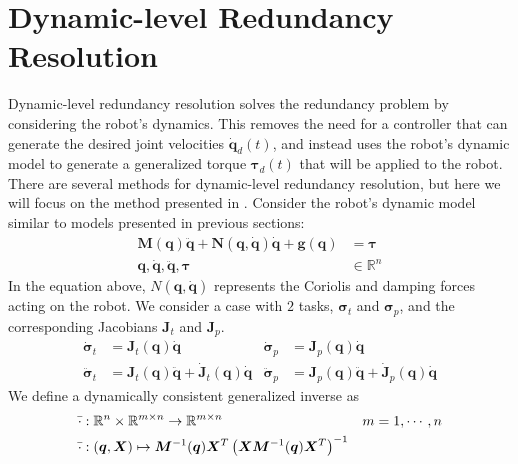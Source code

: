 \newpage
\section{Dynamic-level Redundancy Resolution}

Dynamic-level redundancy resolution solves the redundancy problem by considering
the robot's dynamics. This removes the need for a controller that can generate
the desired joint velocities $\dot{\bm{q}}_d(t)$, and instead uses the robot's
dynamic model to generate a generalized torque $\bm{\tau}_d(t)$ that will
be applied to the robot. There are several methods for dynamic-level redundancy
resolution, but here we will focus on the method presented in \cite{khatib2004}.
Consider the robot's dynamic model similar to models presented in previous sections:
\begin{subequations}
\begin{align}
    \bm{M}(\bm{q}) \ddot{\bm{q}} + \bm{N}(\bm{q}, \dot{\bm{q}}) \dot{\bm{q}} + \bm{g}(\bm{q}) &= \bm{\tau} \\
    \bm{q}, \dot{\bm{q}} ,\ddot{\bm{q}},\bm{\tau} &\in \mathbb{R}^n
\end{align}
\end{subequations}
In the equation above, $N(\bm{q}, \dot{\bm{q}})$ represents the Coriolis and
damping forces acting on the robot. We consider a case with $2$ tasks, $\bm{\sigma}_t$
and $\bm{\sigma}_p$, and the corresponding Jacobians $\bm{J}_t$ and $\bm{J}_p$.
\begin{subequations}
    \begin{align}
        \dot{\bm{\sigma}}_t &= \bm{J}_t(\bm{q}) \dot{\bm{q}} & \dot{\bm{\sigma}}_p &= \bm{J}_p(\bm{q}) \dot{\bm{q}} \\
        \ddot{\bm{\sigma}}_t &= \bm{J}_t(\bm{q}) \ddot{\bm{q}} + \dot{\bm{J}}_t(\bm{q}) \dot{\bm{q}} &
        \ddot{\bm{\sigma}}_p &= \bm{J}_p(\bm{q}) \ddot{\bm{q}} + \dot{\bm{J}}_p(\bm{q}) \dot{\bm{q}}
    \end{align}
\end{subequations}
We define a dynamically consistent generalized inverse \cite{khatib1987} as
\begin{subequations}
    \begin{align}
        \bar{\cdot} &: \mathbb{R}^n \times \mathbb{R}^{m\times n} \rightarrow \mathbb{R}^{m\times n} & m &= 1, \cdots, n\\
        \bar{\cdot} &: (\bm{q},\bm{X}) \mapsto \bm{M}^{-1}(\bm{q})\bm{X}^T\left(
            \bm{X}\bm{M}^{-1}(\bm{q})\bm{X}^T
        \right)^{-1}
    \end{align}
\end{subequations}
